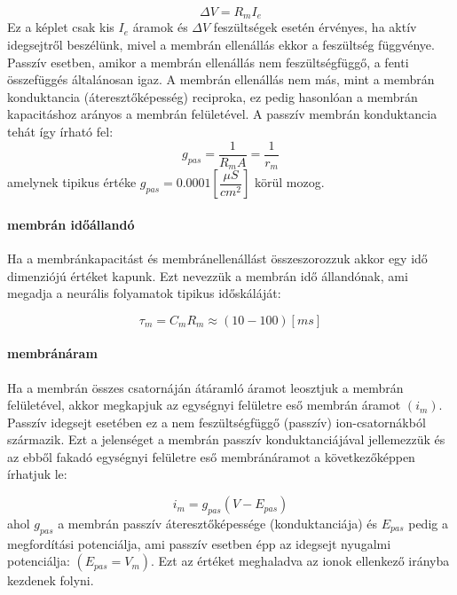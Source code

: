 \begin{equation}\label{eq:Rm}
	\Delta V = R_m I_e
\end{equation}
Ez a képlet csak kis $I_e$ áramok és $\Delta V$ feszültségek esetén érvényes, ha aktív idegsejtről beszélünk, mivel a membrán ellenállás ekkor a feszültség függvénye. Passzív esetben, amikor a membrán ellenállás nem feszültségfüggő, a fenti összefüggés általánosan igaz.
A membrán ellenállás nem más, mint a membrán konduktancia (áteresztőképesség) reciproka, ez pedig hasonlóan a membrán kapacitáshoz arányos a membrán felületével. A passzív membrán konduktancia tehát így írható fel:
\begin{equation}\label{eq:gpas}
	g_{pas} = \dfrac{1}{R_m A} = \dfrac{1}{r_m}
\end{equation}
amelynek tipikus értéke $g_{pas} = 0.0001 \left[\dfrac{\mu S}{cm^2}\right]$ körül mozog.

\paragraph{membrán időállandó}\label{par:tau}
Ha a membránkapacitást és membránellenállást összeszorozzuk akkor egy idő dimenziójú értéket kapunk. Ezt nevezzük a membrán idő állandónak, ami megadja a neurális folyamatok tipikus időskáláját:

\begin{equation}
	\tau_m = C_m R_m \approx \left(10-100\right) \left[ ms \right]
\end{equation}

\paragraph{membránáram}
Ha a membrán összes csatornáján átáramló áramot leosztjuk a membrán felületével, akkor megkapjuk az egységnyi felületre eső membrán áramot $(i_m)$. Passzív idegsejt esetében ez a nem feszültségfüggő (passzív) ion-csatornákból származik. Ezt a jelenséget a membrán passzív konduktanciájával jellemezzük és az ebből fakadó egységnyi felületre eső membránáramot a következőképpen írhatjuk le:

\begin{equation}\label{eq:im}
	i_m = g_{pas}\left( V-E_{pas}\right)
\end{equation}
ahol $g_{pas}$ a membrán passzív áteresztőképessége (konduktanciája) és $E_{pas}$ pedig a megfordítási potenciálja, ami passzív esetben épp az idegsejt nyugalmi potenciálja: $(E_{pas} = V_{m})$. Ezt az értéket meghaladva az ionok ellenkező irányba kezdenek folyni.











